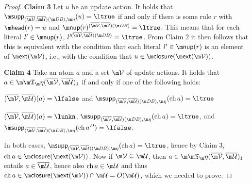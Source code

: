 \begin{proof}
\textbf{Claim 3} 
Let $u$ be an update action. 
It holds that  $\supp_{(\overline\VV,\overline\UU)(\db),\aics}(u) = \ltrue$ if and only if there is some rule $r$ with $\head(r)=u$ and $\nup(r)^{ (\overline\VV, \overline\UU)(\db)} = \ltrue$. This means that for each literal $l'\in \nup(r)$, $l'^{(\overline\VV, \overline\UU)(\db)} = \ltrue$. From Claim 2 it then follows that this is equivalent with the condition that each literal $l'\in\nup(r)$ is an element of   $\ext(\VV)$, i.e., with  the condition that $u \in \closure(\ext(\VV))$. 


\textbf{Claim 4}
Take an atom $a$ and a set $\VV$ of update actions. It holds that $a\in \Ap(\overline\VV,\overline\UU)_1$ if and only if one of the following holds:
\begin{compactitem}
 \item $(\overline \VV,\overline \UU)(a) = \lfalse$ and $\supp_{(\overline\VV,\overline\UU)(\db),\aics}(\change a)=\ltrue$
 \item $(\overline \VV,\overline \UU)(a) = \lunkn$, $ \supp_{(\overline\VV,\overline\UU)(\db),\aics}(\change a)=\ltrue$, and $\supp_{(\overline\VV,\overline\UU)(\db),\aics}(\change a^D) = \lfalse$.
\end{compactitem}
In both cases, $\supp_{(\overline\VV,\overline\UU)(\db),\aics}(\change a)=\ltrue$, hence by Claim 3, $\change a\in \closure(\ext(\VV))$. Now if $\VV\subseteq \UU$, then $a\in\Ap(\overline\VV,\overline\UU)_1$ entails $a\in \overline\UU$, hence also $\change a \in \UU$ and thus $\change a \in \closure(\ext(\VV)) \cap \UU = O(\UU)$, which we needed to prove. \qedhere





\end{proof}
